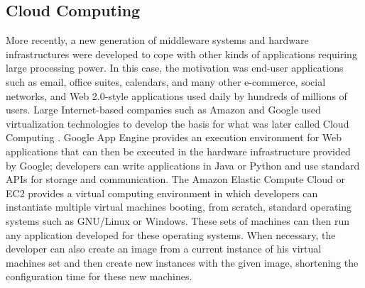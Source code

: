 \subsection{Cloud Computing}
More recently, a new generation of middleware systems and hardware infrastructures were developed to cope with other kinds of applications requiring large processing power. In this case, the motivation was end-user applications such as email, office suites, calendars, and many other e-commerce, social networks, and Web 2.0-style applications used daily by hundreds of millions of users. Large Internet-based companies such as Amazon and Google used virtualization technologies to develop the basis for what was later called Cloud Computing \citep{ZCB10}. Google App Engine provides an execution environment for Web applications that can then be executed in the hardware infrastructure provided by Google; developers can write applications in Java or Python and use standard APIs for storage and communication.  The Amazon Elastic Compute Cloud or EC2 \citep{EC2} provides a virtual computing environment in which developers can instantiate multiple virtual machines booting, from scratch, standard operating systems such as GNU/Linux or Windows. These sets of machines can then run any application developed for these operating systems. When necessary, the developer can also create an image from a current instance of his virtual machines set and then create new instances with the given image, shortening the configuration time for these new machines.